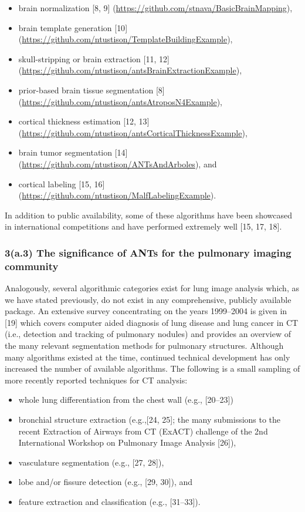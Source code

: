 \documentclass[11pt,]{article}
\begin{document}
\begin{itemize}
\itemsep1pt\parskip0pt
\item
  brain normalization {[}8, 9{]}
  (\url{https://github.com/stnava/BasicBrainMapping}),
\item
  brain template generation {[}10{]}
  (\url{https://github.com/ntustison/TemplateBuildingExample}),
\item
  skull-stripping or brain extraction {[}11, 12{]}
  (\url{https://github.com/ntustison/antsBrainExtractionExample}),
\item
  prior-based brain tissue segmentation {[}8{]}
  (\url{https://github.com/ntustison/antsAtroposN4Example}),
\item
  cortical thickness estimation {[}12, 13{]}
  (\url{https://github.com/ntustison/antsCorticalThicknessExample}),
\item
  brain tumor segmentation {[}14{]}
  (\url{https://github.com/ntustison/ANTsAndArboles}), and
\item
  cortical labeling {[}15, 16{]}
  (\url{https://github.com/ntustison/MalfLabelingExample}).
\end{itemize}

In addition to public availability, some of these algorithms have been
showcased in international competitions and have performed extremely
well {[}15, 17, 18{]}.

\subsubsection{3(a.3) The significance of ANTs for the pulmonary imaging
community}\label{a.3-the-significance-of-ants-for-the-pulmonary-imaging-community}

Analogously, several algorithmic categories exist for lung image
analysis which, as we have stated previously, do not exist in any
comprehensive, publicly available package. An extensive survey
concentrating on the years 1999--2004 is given in {[}19{]} which covers
computer aided diagnosis of lung disease and lung cancer in CT (i.e.,
detection and tracking of pulmonary nodules) and provides an overview of
the many relevant segmentation methods for pulmonary structures.
Although many algorithms existed at the time, continued technical
development has only increased the number of available algorithms. The
following is a small sampling of more recently reported techniques for
CT analysis:

\begin{itemize}
\itemsep1pt\parskip0pt
\item
  whole lung differentiation from the chest wall (e.g., {[}20--23{]})
\item
  bronchial structure extraction (e.g.,{[}24, 25{]}; the many
  submissions to the recent Extraction of Airways from CT (ExACT)
  challenge of the 2nd International Workshop on Pulmonary Image
  Analysis {[}26{]}),
\item
  vasculature segmentation (e.g., {[}27, 28{]}),
\item
  lobe and/or fissure detection (e.g., {[}29, 30{]}), and
\item
  feature extraction and classification (e.g., {[}31--33{]}).
\end{itemize}
\end{document}
